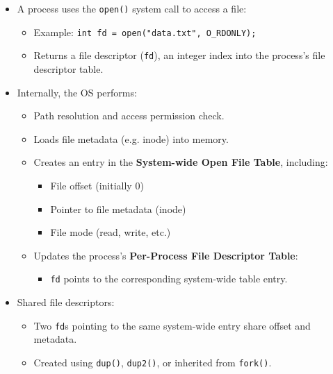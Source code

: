 \documentclass[8pt,twocolumn]{article}
\begin{document}
\begin{itemize}
    \setlength{\itemsep}{0pt} %
    \setlength{\parskip}{0pt}
    \item A process uses the \texttt{open()} system call to access a file:
    \begin{itemize}
        \setlength{\itemsep}{0pt} %
        \setlength{\parskip}{0pt}
      \item Example: \texttt{int fd = open("data.txt", O\_RDONLY);}
      \item Returns a file descriptor (\texttt{fd}), an integer index into the process’s file descriptor table.
    \end{itemize}
  
    \item Internally, the OS performs:
    \begin{itemize}
        \setlength{\itemsep}{0pt} %
        \setlength{\parskip}{0pt}
      \item Path resolution and access permission check.
      \item Loads file metadata (e.g. inode) into memory.
      \item Creates an entry in the \textbf{System-wide Open File Table}, including:
      \begin{itemize}
        \setlength{\itemsep}{0pt} %
        \setlength{\parskip}{0pt}
        \item File offset (initially 0)
        \item Pointer to file metadata (inode)
        \item File mode (read, write, etc.)
      \end{itemize}
      \item Updates the process’s \textbf{Per-Process File Descriptor Table}:
      \begin{itemize}
        \setlength{\itemsep}{0pt} %
        \setlength{\parskip}{0pt}
        \item \texttt{fd} points to the corresponding system-wide table entry.
      \end{itemize}
    \end{itemize}
  
    \item Shared file descriptors:
    \begin{itemize}
        \setlength{\itemsep}{0pt} %
        \setlength{\parskip}{0pt}
      \item Two \texttt{fd}s pointing to the same system-wide entry share offset and metadata.
      \item Created using \texttt{dup()}, \texttt{dup2()}, or inherited from \texttt{fork()}.
    \end{itemize}
  

\end{itemize}
\end{document}
